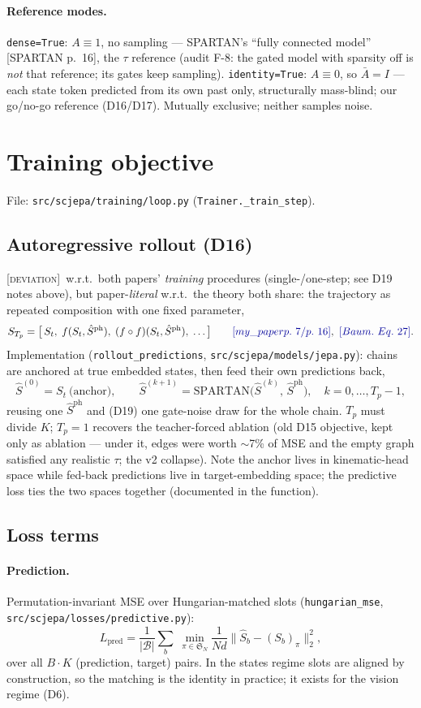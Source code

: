 \documentclass[11pt]{article}
\newcommand{\code}[1]{\texttt{\small #1}}
\newcommand{\paper}[1]{\textcolor{blue!60!black}{[#1]}}
\newcommand{\dev}{\textcolor{red!70!black}{[\textsc{deviation}]}}
\newcommand{\Sph}{\hat{S}^{\mathrm{ph}}}
\newcommand{\Abar}{\bar{A}}
\begin{document}
\paragraph{Reference modes.} \code{dense=True}: $A \equiv 1$, no sampling --- SPARTAN's
``fully connected model'' \paper{SPARTAN p.~16}, the $\tau$ reference (audit F-8: the gated
model with sparsity off is \emph{not} that reference; its gates keep sampling).
\code{identity=True}: $A \equiv 0$, so $\Abar = I$ --- each state token predicted from its
own past only, structurally mass-blind; our go/no-go reference (D16/D17). Mutually
exclusive; neither samples noise.

\section{Training objective}
\label{sec:objective}
File: \code{src/scjepa/training/loop.py} (\code{Trainer.\_train\_step}).

\subsection{Autoregressive rollout (D16)}
\dev{}~w.r.t.\ both papers' \emph{training} procedures (single-/one-step; see D19 notes
above), but paper-\emph{literal} w.r.t.\ the theory both share: the trajectory as repeated
composition with one fixed parameter,
\[
  S_{T_p} = \big[\,S_t,\; f(S_t,\Sph),\; (f\circ f)(S_t,\Sph),\;\dots\big]
  \qquad \paper{my\_paper p.~7/p.~16},\ \paper{Baum.\ Eq.~27}.
\]
Implementation (\code{rollout\_predictions}, \code{src/scjepa/models/jepa.py}): chains are
anchored at true embedded states, then feed their own predictions back,
\[
  \hat S^{(0)} = S_t \ \text{(anchor)},\qquad
  \hat S^{(k+1)} = \mathrm{SPARTAN}\big(\hat S^{(k)},\, \Sph\big),\quad k = 0,\dots,T_p-1,
\]
reusing one $\Sph$ and (D19) one gate-noise draw for the whole chain. $T_p$ must divide
$K$; $T_p{=}1$ recovers the teacher-forced ablation (old D15 objective, kept only as
ablation --- under it, edges were worth $\sim$7\% of MSE and the empty graph satisfied any
realistic $\tau$; the v2 collapse). Note the anchor lives in kinematic-head space while
fed-back predictions live in target-embedding space; the predictive loss ties the two
spaces together (documented in the function).

\subsection{Loss terms}
\paragraph{Prediction.} Permutation-invariant MSE over Hungarian-matched slots
(\code{hungarian\_mse}, \code{src/scjepa/losses/predictive.py}):
\[
  L_{\mathrm{pred}} = \frac{1}{|\mathcal B|} \sum_{b}\;
  \min_{\pi \in \mathfrak S_N} \frac{1}{Nd}\big\|\hat S_b - (S_b)_{\pi}\big\|_2^2 ,
\]
over all $B\!\cdot\!K$ (prediction, target) pairs. In the states regime slots are aligned
by construction, so the matching is the identity in practice; it exists for the vision
regime (D6).
\end{document}
